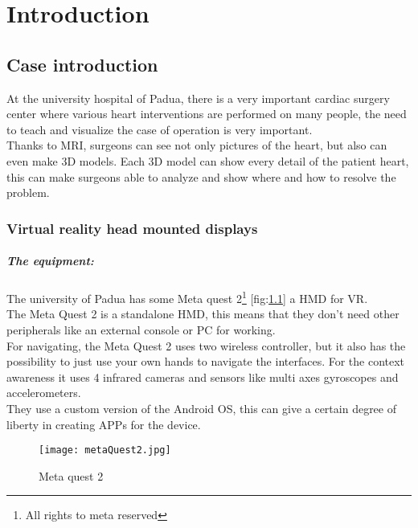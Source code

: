 
\chapter{Introduction}
\label{chp:intro}

\section{Case introduction}

At the university hospital of Padua, 
there is a very important cardiac surgery center where various heart interventions are performed on many people,
the need to teach and visualize the case of operation is very important. \\
Thanks to MRI, surgeons can see not only pictures of the heart, but also can even make 3D models.
Each 3D model can show every detail of the patient heart, this can make surgeons able to analyze and show where and how to resolve the problem.

\subsection{Virtual reality head mounted displays}

\paragraph{The equipment:}
The university of Padua has some Meta quest 2\footnote{All rights to meta reserved} [fig:\ref{fig:metaQuest2}] a \ac{HMD} for \ac{VR}. \\
The Meta Quest 2 is a standalone \ac{HMD}, this means that they don't need other peripherals like an external console or \ac{PC} for working.\\
For navigating, the Meta Quest 2 uses two wireless controller, but it also has the possibility to just use your own hands to navigate the interfaces.
For the context awareness it uses 4 infrared cameras and sensors like multi axes gyroscopes and accelerometers.\\
They use a custom version of the Android \ac{OS}, this can give a certain degree of liberty in creating APPs for the device.

\begin{figure}[h]
  \centering
  \texttt{[image: metaQuest2.jpg]}
  \caption{Meta quest 2}
  \label{fig:metaQuest2}
\end{figure}

